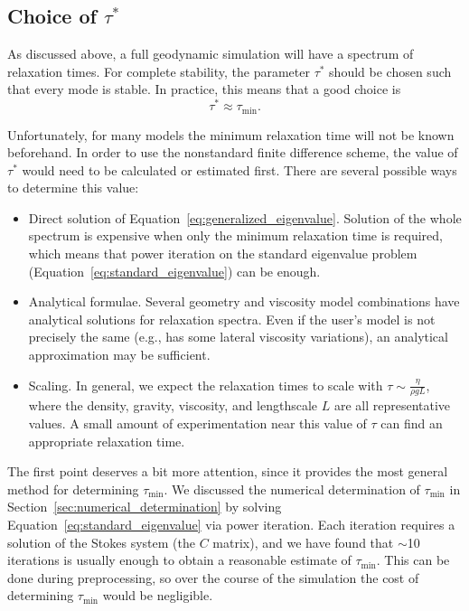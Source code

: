 \documentclass[preprint,12pt,authoryear]{elsarticle}
\begin{document}
\subsection{Choice of $\tau^*$}
\label{sec:tau_choice}
As discussed above, a full geodynamic simulation will have a spectrum of relaxation times.
For complete stability, the parameter $\tau^*$ should be chosen such that every mode is stable.
In practice, this means that a good choice is 
\begin{equation}
\tau^* \approx \tau_{\mathrm{min}}.
\label{eq:tau_choice}
\end{equation}

Unfortunately, for many models the minimum relaxation time will not be known beforehand. 
In order to use the nonstandard finite difference scheme, the value of $\tau^*$ would need 
to be calculated or estimated first.  There are several possible ways to determine this value:

\begin{itemize}
\item Direct solution of Equation~\eqref{eq:generalized_eigenvalue}. Solution of the whole spectrum is expensive
when only the minimum relaxation time is required, which means that power iteration on 
the standard eigenvalue problem (Equation~\eqref{eq:standard_eigenvalue}) can be enough.
\item Analytical formulae. Several geometry and viscosity model combinations have analytical solutions
for relaxation spectra. Even if the user's model is not precisely the same (e.g., has some lateral viscosity
variations), an analytical approximation may be sufficient.
\item Scaling. In general, we expect the relaxation times to scale with $\tau \sim \frac{\eta}{\rho g L}$,
where the density, gravity, viscosity, and lengthscale $L$ are all representative values.  A small amount
of experimentation near this value of $\tau$ can find an appropriate relaxation time.
\end{itemize} 

The first point deserves a bit more attention, since it provides the most general method for determining $\tau_\mathrm{min}$.
We discussed the numerical determination of $\tau_\mathrm{min}$ in Section~\ref{sec:numerical_determination}
by solving Equation~\eqref{eq:standard_eigenvalue} via power iteration.
Each iteration requires a solution of the Stokes system (the $C$ matrix), and we have found
that $\sim$10 iterations is usually enough to obtain a reasonable estimate of $\tau_\mathrm{min}$.
This can be done during preprocessing, so over the course of the simulation the cost of determining
$\tau_\mathrm{min}$ would be negligible.
\end{document}
